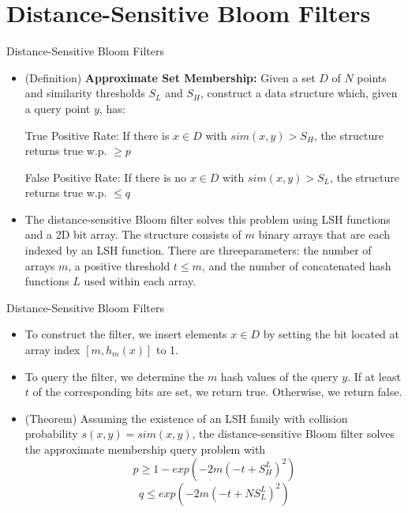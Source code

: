 \documentclass[Serif, 10pt, brown]{beamer}
\theoremstyle{example}
\theoremstyle{plain}
\begin{document}
\section{Distance-Sensitive Bloom Filters}
\begin{frame}{Distance-Sensitive Bloom Filters}
	\begin{itemize}
		\item (Definition) {\bf Approximate Set Membership:} Given a set $D$ of $N$ points and similarity thresholds
		$S_L$ and $S_H$, construct a data structure which, given a query point $y$, has:

		True Positive Rate: If there is $x \in D$ with $sim(x,y) >S_H$, the structure returns true w.p. $ \geq p$

		False Positive Rate: If there is no $x \in D$ with $sim(x,y) > S_L$, the structure returns true w.p. $\leq q$

	\item The distance-sensitive Bloom filter solves this problem using LSH functions and a 2D bit array. The structure consists of $m$ binary arrays that are each indexed by an LSH function. There are threeparameters: the number of arrays $m$, a positive threshold $t \leq m$, and the number of concatenated hash functions $L$ used within each array.  
	\end{itemize}
\end{frame}

\begin{frame}{Distance-Sensitive Bloom Filters}
	\begin{itemize}
		\item To construct the filter, we insert elements $x \in D$ by setting the bit located at array index $[m,h_m(x)]$ to 1. 
		\item To query the filter, we determine the $m$ hash values of the query $y$. If at least $t$ of the corresponding
		bits are set, we return true. Otherwise, we return false. 
		\item (Theorem) Assuming the existence of an LSH family with collision probability $s(x,y) = sim(x,y)$,
		the distance-sensitive Bloom filter solves the approximate membership query problem with
		\[p \geq 1 - exp\left(-2m(-t + S_H^L)^2\right)\]
		\[q \leq exp\left(-2m(-t + NS_L^L)^2\right)\]
	\end{itemize}
\end{frame}
\end{document}
